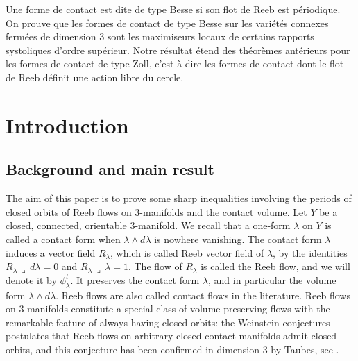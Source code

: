 \documentclass[JEP,XML,SOM,Unicode,published]{cedram}
\theoremstyle{definition}
\let\diff d
\begin{document}
\begin{altabstract}
Une forme de contact est dite de type Besse si son flot de Reeb est périodique. On prouve que les formes de contact de type Besse sur les variétés connexes fermées de dimension $3$ sont les maximiseurs locaux de certains rapports systoliques d'ordre supérieur. Notre résultat étend des théorèmes antérieurs pour les formes de contact de type Zoll, c'est-à-dire les formes de contact dont le flot de Reeb définit une action libre du cercle.
\end{altabstract}

\maketitle
\vspace*{-\baselineskip}%
\tableofcontents
\mainmatter

\section{Introduction}
\label{s:introduction}

\subsection{Background and main result}
The aim of this paper is to prove some sharp inequalities involving the periods of closed orbits of Reeb flows on $3$-manifolds and the contact volume.
Let $Y$ be a closed, connected, orientable $3$-manifold. We recall that a one-form $\lambda$ on $Y$ is called a contact form when $\lambda\wedge d\lambda$ is nowhere vanishing. The contact form $\lambda$ induces a vector field $R_{\lambda}$, which is called Reeb vector field of $\lambda$, by the identities $R_{\lambda} \,\lrcorner\, \diff\lambda = 0$ and $R_{\lambda} \,\lrcorner\, \lambda=1$.
The flow of $R_{\lambda}$ is called the Reeb flow, and we will denote it by $\phi_{\lambda}^t$. It preserves the contact form $\lambda$, and in particular the volume form $\lambda\wedge d\lambda$. Reeb flows are also called contact flows in the literature. Reeb flows on $3$-manifolds constitute a special class of volume preserving flows with the remarkable feature of always having closed orbits: the Weinstein conjectures postulates that Reeb flows on arbitrary closed contact manifolds admit closed orbits, and this conjecture has been confirmed in dimension $3$ by Taubes, see \cite{Taubes:2007wi}.
\end{document}
